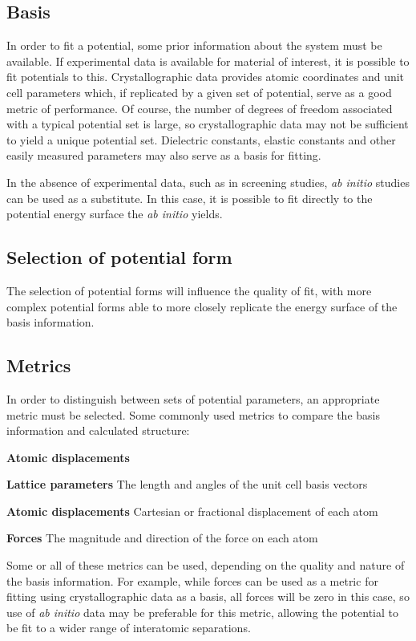\subsection{Basis}
In order to fit a potential, some prior information about the system must be available. 
If experimental data is available for material of interest, it is possible to fit potentials to this.
Crystallographic data provides atomic coordinates and unit cell parameters which, if replicated by a given set of potential, serve as a good metric of performance.
Of course, the number of degrees of freedom associated with a typical potential set is large, so crystallographic data may not be sufficient to yield a unique potential set.
Dielectric constants, elastic constants and other easily measured parameters may also serve as a basis for fitting.

In the absence of experimental data, such as in screening studies, \textit{ab initio} studies can be used as a substitute. 
In this case, it is possible to fit directly to the potential energy surface the \textit{ab initio} yields.

\subsection{Selection of potential form}
The selection of potential forms will influence the quality of fit, with more complex potential forms able to more closely replicate the energy surface of the basis information.


\subsection{Metrics}
In order to distinguish between sets of potential parameters, an appropriate metric must be selected.
Some commonly used metrics to compare the basis information and calculated structure:
\begin{labeling}{\textbf{Atomic displacements}}
	\item [\textbf{Lattice parameters}] The length and angles of the unit cell basis vectors
	\item [\textbf{Atomic displacements}] Cartesian or fractional displacement of each atom
	\item [\textbf{Forces}] The magnitude and direction of the force on each atom
\end{labeling}
Some or all of these metrics can be used, depending on the quality and nature of the basis information.
For example, while forces can be used as a metric for fitting using crystallographic data as a basis, all forces will be zero in this case, so use of \textit{ab initio} data may be preferable for this metric, allowing the potential to be fit to a wider range of interatomic separations.

